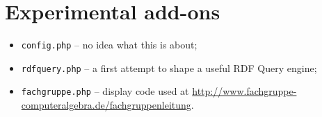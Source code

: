 \documentclass[11pt,a4paper]{article}
\begin{document}
\section{Experimental add-ons}

\begin{itemize}
\item \texttt{config.php} -- no idea what this is about;     
\item \texttt{rdfquery.php} -- a first attempt to shape a useful RDF Query
  engine;
\item \texttt{fachgruppe.php} -- display code used at
  \url{http://www.fachgruppe-computeralgebra.de/fachgruppenleitung}.
\end{itemize}
\end{document}
